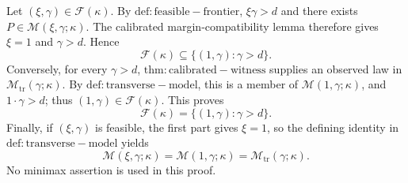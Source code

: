 Let \((\xi,\gamma)\in\mathcal F(\kappa)\). By \(\mathrm{def:feasible-frontier}\), \(\xi\gamma>d\) and there exists \(P\in\mathcal M(\xi,\gamma;\kappa)\). The calibrated margin-compatibility lemma therefore gives \(\xi=1\) and \(\gamma>d\). Hence
\[
\mathcal F(\kappa)\subseteq\{(1,\gamma):\gamma>d\}.
\]
Conversely, for every \(\gamma>d\), \(\mathrm{thm:calibrated-witness}\) supplies an observed law in \(\mathcal M_{\mathrm{tr}}(\gamma;\kappa)\). By \(\mathrm{def:transverse-model}\), this is a member of \(\mathcal M(1,\gamma;\kappa)\), and \(1\cdot\gamma>d\); thus \((1,\gamma)\in\mathcal F(\kappa)\). This proves
\[
\mathcal F(\kappa)=\{(1,\gamma):\gamma>d\}.
\]
Finally, if \((\xi,\gamma)\) is feasible, the first part gives \(\xi=1\), so the defining identity in \(\mathrm{def:transverse-model}\) yields
\[
\mathcal M(\xi,\gamma;\kappa)=\mathcal M(1,\gamma;\kappa)=\mathcal M_{\mathrm{tr}}(\gamma;\kappa).
\]
No minimax assertion is used in this proof.